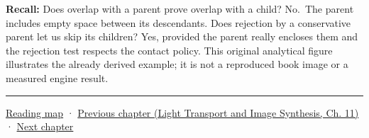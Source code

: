 \textbf{Recall:} Does overlap with a parent prove overlap with a child? No.~The parent includes empty space between its descendants. Does rejection by a conservative parent let us skip its children? Yes, provided the parent really encloses them and the rejection test respects the contact policy. This original analytical figure illustrates the already derived example; it is not a reproduced book image or a measured engine result.

\begin{center}\rule{0.5\linewidth}{0.5pt}\end{center}

\hyperref[volume-reading-map]{Reading map} · \href{../04-Light-Transport-and-Image-Synthesis/main.pdf\#nameddest=06-engine-ii-ch032-terrain-materials-and-image-composition}{Previous chapter (Light Transport and Image Synthesis, Ch. 11)} · \hyperref[06-engine-ii-ch034-rigid-body-motion-from-forces-to-contact]{Next chapter}
